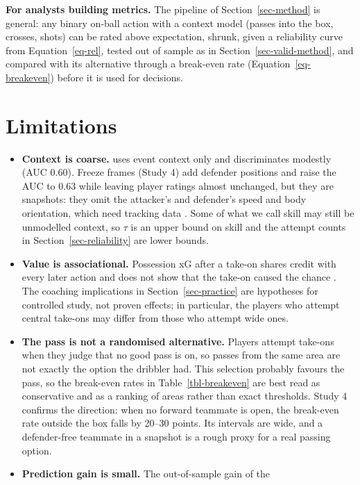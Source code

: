 \documentclass[
  12pt]{article}
\begin{document}
\textbf{For analysts building metrics.} The pipeline of
Section~\ref{sec-method} is general: any binary on-ball action with a
context model (passes into the box, crosses, shots) can be rated above
expectation, shrunk, given a reliability curve from
Equation~\ref{eq-rel}, tested out of sample as in
Section~\ref{sec-valid-method}, and compared with its alternative
through a break-even rate (Equation~\ref{eq-breakeven}) before it is
used for decisions.

\section{Limitations}\label{sec-limits}

\begin{itemize}
\item
  \textbf{Context is coarse.} uses event context only and discriminates
  modestly (AUC 0.60). Freeze frames (Study 4) add defender positions
  and raise the AUC to 0.63 while leaving player ratings almost
  unchanged, but they are snapshots: they omit the attacker's and
  defender's speed and body orientation, which need tracking data
  \citep{fernandez2021}. Some of what we call skill may still be
  unmodelled context, so \(\tau\) is an upper bound on skill and the
  attempt counts in Section~\ref{sec-reliability} are lower bounds.
\item
  \textbf{Value is associational.} Possession xG after a take-on shares
  credit with every later action and does not show that the take-on
  caused the chance \citep{decroos2019}. The coaching implications in
  Section~\ref{sec-practice} are hypotheses for controlled study, not
  proven effects; in particular, the players who attempt central
  take-ons may differ from those who attempt wide ones.
\item
  \textbf{The pass is not a randomised alternative.} Players attempt
  take-ons when they judge that no good pass is on, so passes from the
  same area are not exactly the option the dribbler had. This selection
  probably favours the pass, so the break-even rates in
  Table~\ref{tbl-breakeven} are best read as conservative and as a
  ranking of areas rather than exact thresholds. Study 4 confirms the
  direction: when no forward teammate is open, the break-even rate
  outside the box falls by 20--30 points. Its intervals are wide, and a
  defender-free teammate in a snapshot is a rough proxy for a real
  passing option.
\item
  \textbf{Prediction gain is small.} The out-of-sample gain of the

\end{itemize}
\end{document}
